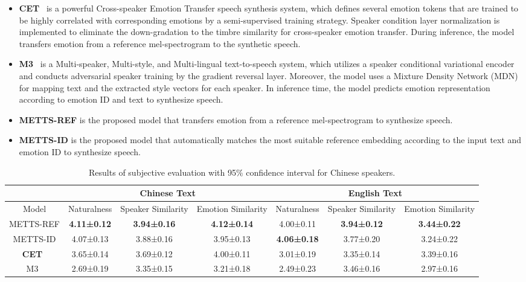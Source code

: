 \documentclass[journal,comsoc]{IEEEtran}
\begin{document}
\begin{itemize}
  \item
  \textbf{CET}~\cite{DBLP:journals/corr/abs-2110-04153} is a powerful Cross-speaker Emotion Transfer speech synthesis system, which defines several emotion tokens that are trained to be highly correlated with corresponding emotions by a semi-supervised training strategy. Speaker condition layer normalization is implemented to eliminate the down-gradation to the timbre similarity for cross-speaker emotion transfer. During inference, the model transfers emotion from a reference mel-spectrogram to the synthetic speech.
  \item
  \textbf{M3}~\cite{DBLP:conf/interspeech/ShangHZZ021} is a Multi-speaker, Multi-style, and Multi-lingual text-to-speech system, which utilizes a speaker conditional variational encoder and conducts adversarial speaker training by the gradient reversal layer. Moreover, the model uses a Mixture Density Network (MDN) for mapping text and the extracted style vectors for each speaker. In inference time, the model predicts emotion representation according to emotion ID and text to synthesize speech.
  \item
  \textbf{METTS-REF} is the proposed model that transfers emotion from a reference mel-spectrogram to synthesize speech. 
  \item
  \textbf{METTS-ID} is the proposed model that automatically matches the most suitable reference embedding according to the input text and emotion ID to synthesize speech.
\end{itemize}

\begin{table}[htb]
\centering
\caption{Results of subjective evaluation with 95$\%$ confidence interval for Chinese speakers.}
\label{tab_1}
\begin{tabular}{@{}c|ccc|ccc@{}}
\toprule
                             & \multicolumn{3}{c|}{Chinese Text}                            & \multicolumn{3}{c}{English Text}                      \\ \midrule
Model                        & Naturalness & Speaker Similarity & Emotion Similarity & Naturalness & Speaker Similarity & Emotion Similarity \\ \midrule
METTS-REF    & \textbf{4.11±0.12} & \textbf{3.94±0.16} & \textbf{4.12±0.14} & 4.00±0.11 & \textbf{3.94±0.12} & \textbf{3.44±0.22} \\
METTS-ID     & 4.07±0.13          & 3.88±0.16          & 3.95±0.13          & \textbf{4.06±0.18}          & 3.77±0.20          & 3.24±0.22          \\
\textbf{CET}~\cite{DBLP:journals/corr/abs-2110-04153}      & 3.65±0.14          & 3.69±0.12          & 4.00±0.11          & 3.01±0.19          & 3.35±0.14          & 3.39±0.16          \\
M3~\cite{DBLP:conf/interspeech/ShangHZZ021}     & 2.69±0.19          & 3.35±0.15          & 3.21±0.18          & 2.49±0.23          & 3.46±0.16          & 2.97±0.16          \\
\bottomrule
\end{tabular}
\end{table}
\end{document}

